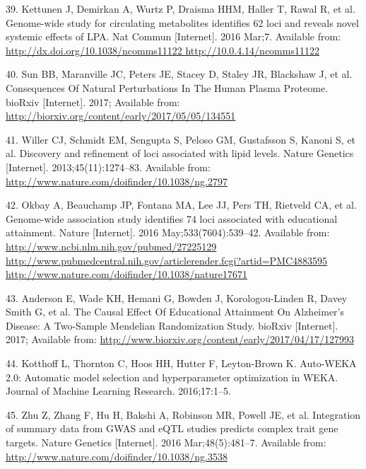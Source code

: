 \documentclass[]{article}
\begin{document}
\hypertarget{ref-Kettunen2016}{}
39. Kettunen J, Demirkan A, Wurtz P, Draisma HHM, Haller T, Rawal R, et
al. Genome-wide study for circulating metabolites identifies 62 loci and
reveals novel systemic effects of LPA. Nat Commun {[}Internet{]}. 2016
Mar;7. Available from:
\href{http://dx.doi.org/10.1038/ncomms11122\%20http://10.0.4.14/ncomms11122}{http://dx.doi.org/10.1038/ncomms11122 http://10.0.4.14/ncomms11122}

\hypertarget{ref-Sun2017}{}
40. Sun BB, Maranville JC, Peters JE, Stacey D, Staley JR, Blackshaw J,
et al. Consequences Of Natural Perturbations In The Human Plasma
Proteome. bioRxiv {[}Internet{]}. 2017; Available from:
\url{http://biorxiv.org/content/early/2017/05/05/134551}

\hypertarget{ref-Willer2013}{}
41. Willer CJ, Schmidt EM, Sengupta S, Peloso GM, Gustafsson S, Kanoni
S, et al. Discovery and refinement of loci associated with lipid levels.
Nature Genetics {[}Internet{]}. 2013;45(11):1274--83. Available from:
\url{http://www.nature.com/doifinder/10.1038/ng.2797}

\hypertarget{ref-Okbay2016}{}
42. Okbay A, Beauchamp JP, Fontana MA, Lee JJ, Pers TH, Rietveld CA, et
al. Genome-wide association study identifies 74 loci associated with
educational attainment. Nature {[}Internet{]}. 2016
May;533(7604):539--42. Available from:
\href{http://www.ncbi.nlm.nih.gov/pubmed/27225129\%20http://www.pubmedcentral.nih.gov/articlerender.fcgi?artid=PMC4883595\%20http://www.nature.com/doifinder/10.1038/nature17671}{http://www.ncbi.nlm.nih.gov/pubmed/27225129 http://www.pubmedcentral.nih.gov/articlerender.fcgi?artid=PMC4883595 http://www.nature.com/doifinder/10.1038/nature17671}

\hypertarget{ref-Anderson2017}{}
43. Anderson E, Wade KH, Hemani G, Bowden J, Korologou-Linden R, Davey
Smith G, et al. The Causal Effect Of Educational Attainment On
Alzheimer's Disease: A Two-Sample Mendelian Randomization Study. bioRxiv
{[}Internet{]}. 2017; Available from:
\url{http://www.biorxiv.org/content/early/2017/04/17/127993}

\hypertarget{ref-kotthoff2016auto}{}
44. Kotthoff L, Thornton C, Hoos HH, Hutter F, Leyton-Brown K. Auto-WEKA
2.0: Automatic model selection and hyperparameter optimization in WEKA.
Journal of Machine Learning Research. 2016;17:1--5.

\hypertarget{ref-Zhu2016}{}
45. Zhu Z, Zhang F, Hu H, Bakshi A, Robinson MR, Powell JE, et al.
Integration of summary data from GWAS and eQTL studies predicts complex
trait gene targets. Nature Genetics {[}Internet{]}. 2016
Mar;48(5):481--7. Available from:
\url{http://www.nature.com/doifinder/10.1038/ng.3538}
\end{document}
